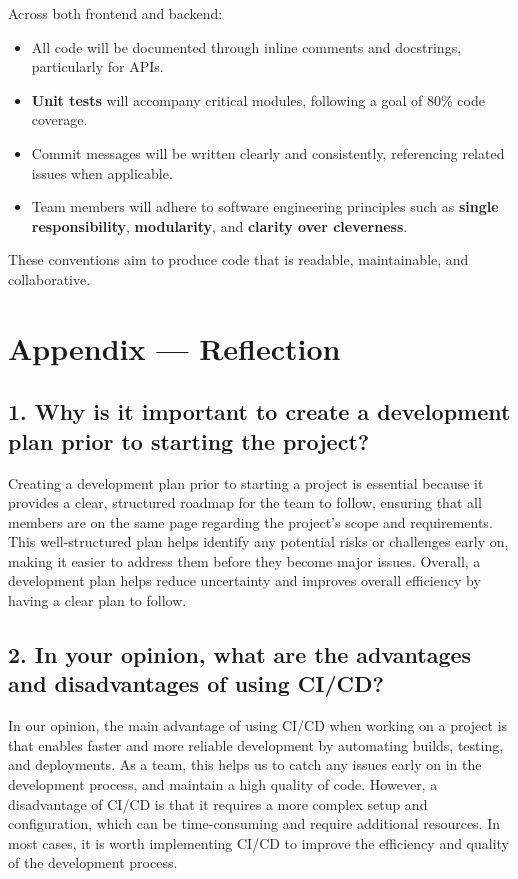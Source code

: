 \documentclass{article}
\begin{document}
Across both frontend and backend:
\begin{itemize}
  \item All code will be documented through inline comments and docstrings,
  particularly for APIs.
  \item \textbf{Unit tests} will accompany critical modules, following a goal of
  80\% code coverage.
  \item Commit messages will be written clearly and consistently, referencing
  related issues when applicable.
  \item Team members will adhere to software engineering principles such as
  \textbf{single responsibility}, \textbf{modularity}, and \textbf{clarity over
  cleverness}.
\end{itemize}

These conventions aim to produce code that is readable, maintainable, and
collaborative.

\newpage{}

\section*{Appendix --- Reflection}

\iffalse
\wss{Not required for CAS 741}
\fi


\subsection*{1. Why is it important to create a development plan prior to starting the project?}
Creating a development plan prior to starting a project is essential because it provides a clear, structured roadmap for the team to follow, ensuring that all members are on the same page regarding the project's scope and requirements. This well-structured plan helps identify any potential risks or challenges early on, making it easier to address them before they become major issues. Overall, a development plan helps reduce uncertainty and improves overall efficiency by having a clear plan to follow.

\subsection*{2. In your opinion, what are the advantages and disadvantages of using CI/CD?}
In our opinion, the main advantage of using CI/CD when working on a project is that enables faster and more reliable development by automating builds, testing, and deployments. As a team, this helps us to catch any issues early on in the development process, and maintain a high quality of code. However, a disadvantage of CI/CD is that it requires a more complex setup and configuration, which can be time-consuming and require additional resources. In most cases, it is worth implementing CI/CD to improve the efficiency and quality of the development process.
\end{document}
